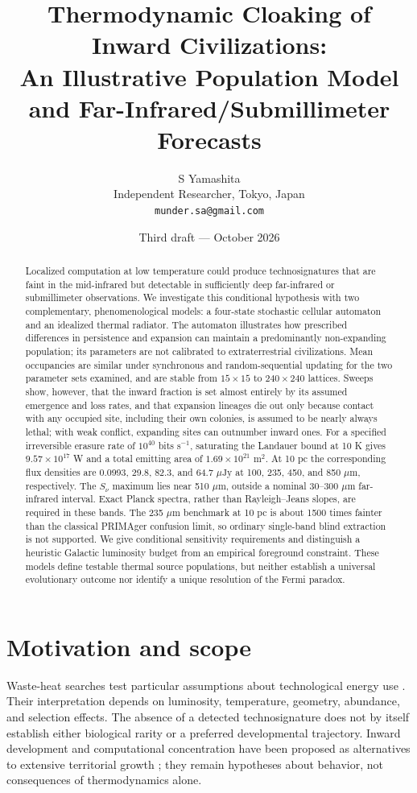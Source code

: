 \documentclass[10pt,twocolumn]{article}
\title{\textbf{Thermodynamic Cloaking of Inward Civilizations:}\\
An Illustrative Population Model and Far-Infrared/Submillimeter Forecasts}
\author{S Yamashita\\\small Independent Researcher, Tokyo, Japan\\
\small\texttt{munder.sa@gmail.com}}
\date{Third draft --- October 2026}
\newcommand{\ujy}{\mu\mathrm{Jy}}
\begin{document}
\maketitle
\begin{abstract}
Localized computation at low temperature could produce technosignatures
that are faint in the mid-infrared but detectable in sufficiently deep
far-infrared or submillimeter observations. We investigate this conditional
hypothesis with two complementary, phenomenological models: a four-state
stochastic cellular automaton and an idealized thermal radiator. The
automaton illustrates how prescribed differences in persistence and
expansion can maintain a predominantly non-expanding population; its
parameters are not calibrated to extraterrestrial civilizations. Mean
occupancies are similar under synchronous and random-sequential updating
for the two parameter sets examined, and are stable from $15\times15$
to $240\times240$ lattices. Sweeps show, however, that the inward
fraction is set almost entirely by its assumed emergence and loss rates,
and that expansion lineages die out only because contact with any
occupied site, including their own colonies, is assumed to be nearly
always lethal; with weak conflict, expanding sites can outnumber inward
ones. For a
specified irreversible erasure rate of $10^{40}$ bits s$^{-1}$, saturating
the Landauer bound at 10 K gives $9.57\times10^{17}$ W and a total emitting
area of $1.69\times10^{21}$ m$^2$. At 10 pc the corresponding flux densities
are 0.0993, 29.8, 82.3, and 64.7 $\ujy$ at 100, 235, 450, and
850 $\mu$m, respectively. The $S_\nu$ maximum lies near 510 $\mu$m,
outside a nominal 30--300 $\mu$m far-infrared interval. Exact Planck
spectra, rather than Rayleigh--Jeans slopes, are required in these bands.
The 235 $\mu$m benchmark at 10 pc is about 1500 times fainter than the
classical PRIMAger confusion limit, so ordinary single-band blind
extraction is not supported. We give conditional sensitivity
requirements and distinguish a heuristic
Galactic luminosity budget from an empirical foreground constraint.
These models define testable thermal source populations, but neither
establish a universal evolutionary outcome nor identify a unique
resolution of the Fermi paradox.
\end{abstract}

\section{Motivation and scope}
Waste-heat searches test particular assumptions about technological energy
use \cite{Dyson1960,Wright2014}. Their interpretation depends on luminosity,
temperature, geometry, abundance, and selection effects. The absence of a
detected technosignature does not by itself establish either biological
rarity or a preferred developmental trajectory. Inward development and
computational concentration have been proposed as alternatives to extensive
territorial growth \cite{Smart2012}; they remain hypotheses about behavior,
not consequences of thermodynamics alone.
\end{document}
